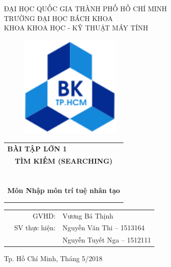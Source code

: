 \documentclass[a4paper]{article}
\begin{document}
\begin{titlepage}
\begin{center}
ĐẠI HỌC QUỐC GIA THÀNH PHỐ HỒ CHÍ MINH \\
TRƯỜNG ĐẠI HỌC BÁCH KHOA \\
KHOA KHOA HỌC - KỸ THUẬT MÁY TÍNH 
\end{center}

\vspace{1cm}

\begin{figure}[h!]
\begin{center}
\includegraphics[width=5cm]{Images/hcm.png}
\end{center}
\end{figure}

\vspace{1cm}


\begin{center}
\begin{tabular}{c}
\multicolumn{1}{l}{\centerline{\textbf{{\Large BÀI TẬP LỚN 1 }}}}\\
\textbf{{\Huge TÌM KIẾM (SEARCHING)}}\\
~~\\
\hline
\\
\\
\textbf{{\Huge Môn Nhập môn trí tuệ nhân tạo}} \\
\\
\hline
\\
\end{tabular}
\end{center}

\vspace{1cm}

\begin{table}[h]
\begin{tabular}{rrl}
\hspace{5 cm} & GVHD: & Vương Bá Thịnh\\

& SV thực hiện: & Nguyễn Văn Thi -- 1513164 \\
& & Nguyễn Tuyết Nga -- 1512111 \\
\end{tabular}
\end{table}

\vspace{1cm}
\begin{center}
{\footnotesize Tp. Hồ Chí Minh, Tháng 5/2018}
\end{center}
\end{titlepage} 
\end{document}
